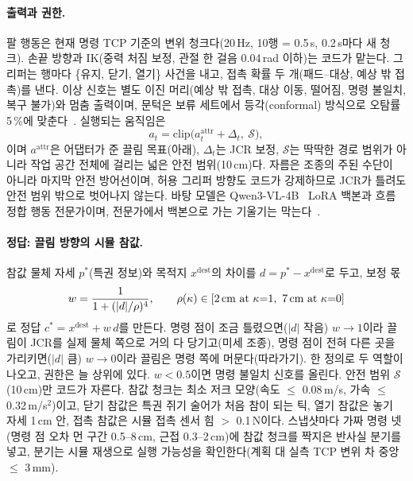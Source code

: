 \paragraph{출력과 권한.} 팔 행동은 현재 명령 TCP 기준의 변위 청크다(20\,Hz, 10행 = 0.5\,s, 0.2\,s마다 새 청크). 손끝 방향과 IK(중력 처짐 보정, 관절 한 걸음 0.04\,rad 이하)는 코드가 맡는다. 그리퍼는 행마다 \{유지, 닫기, 열기\} 사건을 내고, 접촉 확률 두 개(패드--대상, 예상 밖 접촉)를 낸다. 이상 신호는 별도 이진 머리(예상 밖 접촉, 대상 이동, 떨어짐, 명령 불일치, 복구 불가)와 멈춤 출력이며, 문턱은 보류 세트에서 등각(conformal) 방식으로 오탐률 5\,\%에 맞춘다~\cite{faildetect2025}. 실행되는 움직임은
\begin{equation}
  a_t = \mathrm{clip}\bigl(a^{\text{attr}}_t + \Delta_t,\ \mathcal{S}\bigr),
\end{equation}
이며 $a^{\text{attr}}$은 어댑터가 준 끌림 목표(아래), $\Delta_t$는 JCR 보정, $\mathcal{S}$는 딱딱한 경로 범위가 아니라 작업 공간 전체에 걸리는 넓은 안전 범위(10\,cm)다. 자름은 조종의 주된 수단이 아니라 마지막 안전 방어선이며, 허용 그리퍼 방향도 코드가 강제하므로 JCR가 틀려도 안전 범위 밖으로 벗어나지 않는다. 바탕 모델은 Qwen3-VL-4B~\cite{qwen3vl2025} LoRA 백본과 흐름 정합 행동 전문가이며, 전문가에서 백본으로 가는 기울기는 막는다~\cite{kinsulate2025}.

\paragraph{정답: 끌림 방향의 시뮬 참값.} 참값 물체 자세 $p^\ast$(특권 정보)와 목적지 $x^{\text{dest}}$의 차이를 $d = p^\ast - x^{\text{dest}}$로 두고, 보정 몫
\begin{equation}
  w = \frac{1}{1 + (|d| / \rho)^4}, \qquad \rho(\kappa) \in [\text{2\,cm at } \kappa{=}1,\ \text{7\,cm at } \kappa{=}0]
\end{equation}
로 정답 $c^\ast = x^{\text{dest}} + w\,d$를 만든다. 명령 점이 조금 틀렸으면($|d|$ 작음) $w \to 1$이라 끌림이 JCR를 실제 물체 쪽으로 거의 다 당기고(미세 조종), 명령 점이 전혀 다른 곳을 가리키면($|d|$ 큼) $w \to 0$이라 끌림은 명령 쪽에 머문다(따라가기). 한 정의로 두 역할이 나오고, 권한은 늘 상위에 있다. $w < 0.5$이면 명령 불일치 신호를 올린다. 안전 범위 $\mathcal{S}$(10\,cm)만 코드가 자른다. 참값 청크는 최소 저크 모양(속도 $\le$ 0.08\,m/s, 가속 $\le$ 0.32\,m/s$^2$)이고, 닫기 참값은 특권 쥐기 술어가 처음 참이 되는 틱, 열기 참값은 놓기 자세 1\,cm 안, 접촉 참값은 시뮬 접촉 센서 힘 $>$ 0.1\,N이다. 스냅샷마다 가짜 명령 넷(명령 점 오차 먼 구간 0.5--8\,cm, 근접 0.3--2\,cm)에 참값 청크를 짝지은 반사실 분기를 넣고, 분기는 시뮬 재생으로 실행 가능성을 확인한다(계획 대 실측 TCP 변위 차 중앙 $\le$ 3\,mm).

